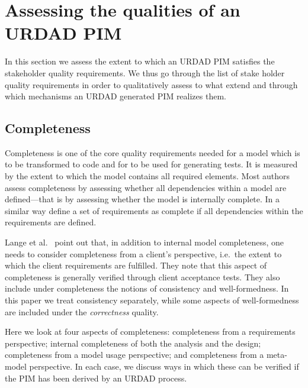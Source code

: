 \section{Assessing the qualities of an URDAD PIM}
\label{sec:assessment}
In this section we assess the extent to which an URDAD PIM satisfies the stakeholder quality requirements. We thus go through the list of stake holder quality requirements in order to qualitatively assess to what extend and through which mechanisms an URDAD generated PIM realizes them.




\subsection{Completeness}

Completeness is one of the core quality requirements needed for a model which is to be transformed to code and for to be used for generating tests. It is measured by the extent to which the model contains all required elements. Most authors
\cite{lange_2004:anEmpiricalAssessmentOfCompletenessInUmlDesign, lange_2005:managingModelQuality, hussain_2007:applyingFuzzyLogicToMeasureCompleteness,
cardei:ModelBasedRequirementsSpecificationAndValidationForComponentArchitectures}
assess completeness by assessing whether all dependencies within a model are defined---that is by assessing whether the model is internally complete. In a similar way
\cite{zowghi_2003:completenessConsistencyCorrectnessOfRequirements}
define a set of requirements as complete if all dependencies within the requirements are defined.

Lange et al.\
\cite{lange_2004:anEmpiricalAssessmentOfCompletenessInUmlDesign}
point out that, in addition to internal model completeness, one needs to consider completeness from a client's perspective, i.e.\ the extent to which the client requirements
are fulfilled. They note that this aspect of completeness is generally verified through client acceptance tests. They also include under completeness the notions of consistency and well-formedness. In this paper we treat consistency separately, while some aspects of well-formedness are included under the {\em correctness} quality.

Here we look at four aspects of completeness: completeness from a requirements perspective; internal completeness of both the analysis and the design; completeness from a model usage perspective; and completeness from a meta-model perspective. In each case, we discuss ways in which these can be verified if the PIM has been derived by an URDAD process.


